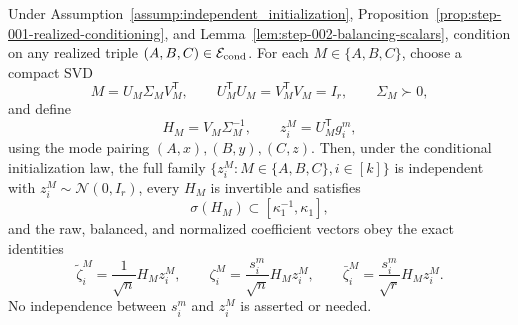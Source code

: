 \begin{lemma}
\label{lem:step-002-coefficient-gaussianization}
Under Assumption~\ref{assump:independent_initialization}, Proposition~\ref{prop:step-001-realized-conditioning}, and
Lemma~\ref{lem:step-002-balancing-scalars}, condition on any realized triple
\((A,B,C)\in\mathcal E_{\rm cond}\). For each
\(M\in\{A,B,C\}\), choose a compact SVD
\[
  M=U_M\Sigma_MV_M^{\mathsf T},
  \qquad U_M^{\mathsf T}U_M=V_M^{\mathsf T}V_M=I_r,
  \qquad \Sigma_M\succ0,
\]
and define
\[
  H_M=V_M\Sigma_M^{-1},
  \qquad z_i^M=U_M^{\mathsf T}g_i^m,
\]
using the mode pairing \((A,x),(B,y),(C,z)\). Then, under the conditional
initialization law, the full family
\(\{z_i^M:M\in\{A,B,C\},i\in[k]\}\) is independent with
\(z_i^M\sim\mathcal N(0,I_r)\), every \(H_M\) is invertible and satisfies
\[
  \sigma(H_M)\subset[\kappa_1^{-1},\kappa_1],
\]
and the raw, balanced, and normalized coefficient vectors obey the exact
identities
\[
  \widetilde\zeta_i^M=\frac1{\sqrt n}H_Mz_i^M,
  \qquad
  \zeta_i^M=\frac{s_i^m}{\sqrt n}H_Mz_i^M,
  \qquad
  \boxed{\bar\zeta_i^M=\frac{s_i^m}{\sqrt r}H_Mz_i^M}.
\]
No independence between \(s_i^m\) and \(z_i^M\) is asserted or needed.

\end{lemma}

